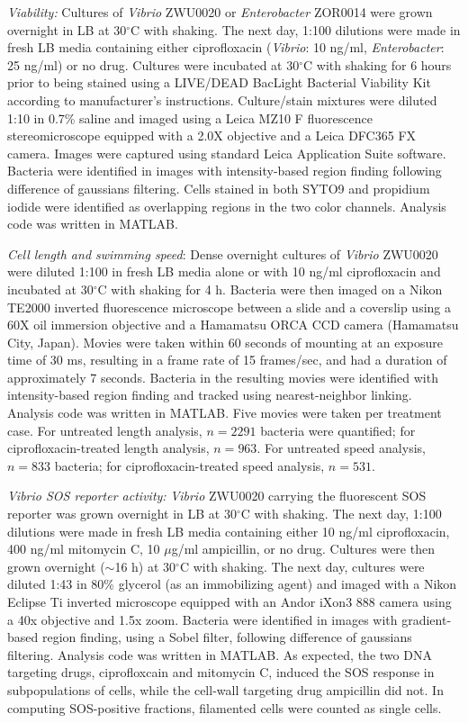 \textit{Viability:} Cultures of \textit{Vibrio} ZWU0020 or \textit{Enterobacter} ZOR0014 were grown overnight in LB at 30$^{\circ}$C with shaking. The next day, 1:100 dilutions were made in fresh LB media containing either ciprofloxacin (\textit{Vibrio}: 10 ng/ml, \textit{Enterobacter}: 25 ng/ml) or no drug. Cultures were incubated at 30$^{\circ}$C with shaking for 6 hours prior to being stained using a LIVE/DEAD BacLight Bacterial Viability Kit according to manufacturer's instructions. Culture/stain mixtures were diluted 1:10 in 0.7\% saline and imaged using a Leica MZ10 F fluorescence stereomicroscope equipped with a 2.0X objective and a Leica DFC365 FX camera. Images were captured using standard Leica Application Suite software. Bacteria were identified in images with intensity-based region finding following difference of gaussians filtering. Cells stained in both SYTO9 and propidium iodide were identified as overlapping regions in the two color channels. Analysis code was written in MATLAB.

\textit{Cell length and swimming speed}: Dense overnight cultures of \textit{Vibrio} ZWU0020 were diluted 1:100 in fresh LB media alone or with 10 ng/ml ciprofloxacin and incubated at 30$^{\circ}$C with shaking for 4 h. Bacteria were then imaged on a Nikon TE2000 inverted fluorescence microscope between a slide and a coverslip using a 60X oil immersion objective and a Hamamatsu ORCA CCD camera (Hamamatsu City, Japan). Movies were taken within 60 seconds of mounting at an exposure time of 30 ms, resulting in a frame rate of 15 frames/sec, and had a duration of approximately 7 seconds. Bacteria in the resulting movies were identified with intensity-based region finding and tracked using nearest-neighbor linking. Analysis code was written in MATLAB. Five movies were taken per treatment case. For untreated length analysis, $n = 2291$ bacteria were quantified; for ciprofloxacin-treated length analysis, $n = 963$. For untreated speed analysis, $n = 833$ bacteria; for ciprofloxacin-treated speed analysis, $n = 531$.

\textit{Vibrio SOS reporter activity:} \textit{Vibrio} ZWU0020 carrying the fluorescent SOS reporter was grown overnight in LB at 30$^{\circ}$C with shaking. The next day, 1:100 dilutions were made in fresh LB media containing either 10 ng/ml ciprofloxacin, 400 ng/ml mitomycin C, 10 $\mu$g/ml ampicillin, or no drug. Cultures were then grown overnight ($\sim$16 h) at 30$^{\circ}$C with shaking. The next day, cultures were diluted 1:43 in 80\% glycerol (as an immobilizing agent) and imaged with a Nikon Eclipse Ti inverted microscope equipped with an Andor iXon3 888 camera using a 40x objective and 1.5x zoom. Bacteria were identified in images with gradient-based region finding, using a Sobel filter, following difference of gaussians filtering. Analysis code was written in MATLAB. As expected, the two DNA targeting drugs, ciprofloxcain and mitomycin C, induced the SOS response in subpopulations of cells, while the cell-wall targeting drug ampicillin did not. In computing SOS-positive fractions, filamented cells were counted as single cells.

